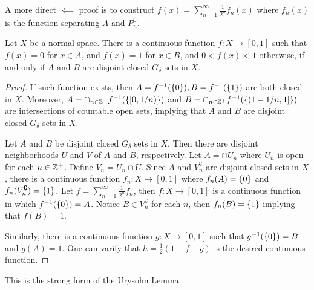 \documentclass[12pt,a4paper]{article}
\begin{document}
    \begin{remark}
        A more direct $\impliedby$ proof is to construct $f(x)=\sum_{n=1}^\infty \frac{1}{2^n}f_n(x)$ where $f_n(x)$ is the function separating $A$ and $P_n^\complement$.
    \end{remark}
    \hfill

    \begin{ex}
        Let $X$ be a normal space. There is a continuous function $f:X\to[0,1]$ such that $f(x)=0$ for $x\in A$, and $f(x)=1$ for $x\in B$, and $0<f(x)<1$ otherwise, if and only if $A$ and $B$ are disjoint closed $G_\delta$ sets in $X$.
    \end{ex}
    \begin{proof}
        If such function exists, then $A=f^{-1}(\left\{0\right\}),B=f^{-1}(\left\{1\right\})$ are both closed in $X$. Moreover, $A=\cap_{n\in\mathbb{Z}^+} f^{-1}(\left\{[0,1/n)\right\})$ and $B=\cap_{n\in\mathbb{Z}^+} f^{-1}(\left\{(1-1/n,1]\right\})$ are intersections of countable open sets, implying that $A$ and $B$ are disjoint closed $G_\delta$ sets in $X$.
        
        Let $A$ and $B$ be disjoint closed $G_\delta$ sets in $X$. Then there are disjoint neighborhoods $U$ and $V$ of $A$ and $B$, respectively. Let $A=\cap U_n$ where $U_n$ is open for each $n\in\mathbb{Z}^+$. Define $V_n=U_n\cap U$. Since $A$ and $V_n^\complement$ are disjoint closed sets in $X$, there is a continuous function $f_n:X\to [0,1]$ where $f_n(A)=\left\{0\right\}$ and $f_n(V_n^\complement)=\left\{1\right\}$. Let $f=\sum_{n=1}^\infty\frac{1}{2^n}f_n$, then $f:X\to [0,1]$ is a continuous function in which $f^{-1}(\left\{0\right\})=A$. Notice $B\in V_n^{\complement}$ for each $n$, then $f_n(B)=\left\{1\right\}$ implying that $f(B)=1$. 

        Similarly, there is a continuous function $g:X\to[0,1]$ such that $g^{-1}(\left\{0\right\})=B$ and $g(A)=1$. One can varify that $h=\frac{1}{2}(1+f-g)$ is the desired continuous function.
    \end{proof}
    \begin{remark}
        This is the strong form of the Urysohn Lemma.
    \end{remark}
    \hfill
\end{document}
